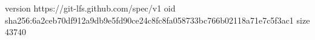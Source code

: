 version https://git-lfs.github.com/spec/v1
oid sha256:6a2ceb70df912a9db9e5fd90ce24c8fc8fa058733bc766b02118a71e7c5f3ac1
size 43740
